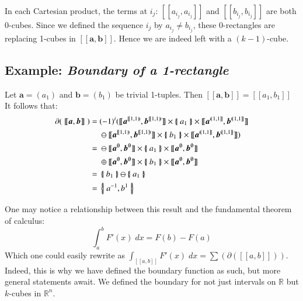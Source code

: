 In each Cartesian product, the terms at $i_j$: $[\![a_{i_j}, a_{i_j}]\!]$ and $[\![b_{i_j}, b_{i_j}]\!]$ are both 0-cubes.
Since we defined the sequence $i_j$ by $a_{i_j} \neq b_{i_j}$, 
these 0-rectangles are replacing 1-cubes in $[\![\boldsymbol{a}, \boldsymbol{b}]\!]$.
Hence we are indeed left with a $(k-1)$-cube.




\subsection{Example: \emph{Boundary of a 1-rectangle}}
Let $\boldsymbol{a}= (a_1)$ and $\boldsymbol{b} = (b_1)$ be trivial 1-tuples. 
Then $[\![\boldsymbol{a}, \boldsymbol{b}]\!] = [\![a_1, b_1]\!]$
It follows that:
\begin{align*}
	\partial ( \; [\![ \boldsymbol{a}, \boldsymbol{b} ]\!] \; )
	=& \; (-1)^i ( [\![\boldsymbol{a}^{[\![1,1)\!)}, \boldsymbol{b}^{[\![1,1)\!)} ]\!]
	\times \hset{a_1} \times
	[\![\boldsymbol{a}^{(\!(1,1]\!]}, \boldsymbol{b}^{(\!(1,1]\!]} ]\!]\\
	&\; \ominus
	[\![\boldsymbol{a}^{[\![1,1)\!)}, \boldsymbol{b}^{[\![1,1)\!)} ]\!]
	\times \hset{b_1} \times
	[\![\boldsymbol{a}^{(\!(1,1]\!]}, \boldsymbol{b}^{(\!(1,1]\!]} ]\!] )\\
	=& \; \ominus [\![\boldsymbol{a}^{\emptyset}, \boldsymbol{b}^{\emptyset} ]\!]
	\times \hset{a_1} \times
	[\![\boldsymbol{a}^{\emptyset}, \boldsymbol{b}^{\emptyset} ]\!]\\
	& \; \oplus
	[\![\boldsymbol{a}^{\emptyset}, \boldsymbol{b}^{\emptyset} ]\!]
	\times \hset{b_1} \times
	[\![\boldsymbol{a}^{\emptyset}, \boldsymbol{b}^{\emptyset} ]\!] \\
	=& \; \hset{b_1} \ominus \hset{a_1} \\
	=& \; \hset{a^{-1}, b^{1}}
\end{align*}

One may notice a relationship between this result and the fundamental theorem of calculus:
\begin{equation}
	\int_a^b F'(x) \; dx = F(b) - F(a)
\end{equation}
Which one could easily rewrite as $\int_{[\![a,b]\!]} F'(x) \; dx = \sum (\partial([\![a,b]\!]))$.
Indeed, this is why we have defined the boundary function as such, but more general statements await.
We defined the boundary for not just intervals on $\mathbb{R}$ but $k$-cubes in $\mathbb{R}^n$.




